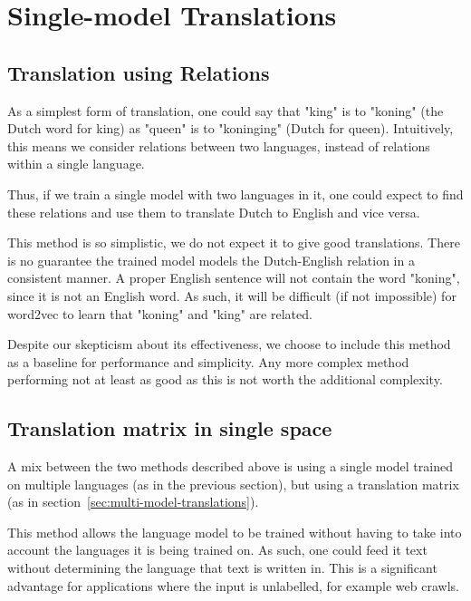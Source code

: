 \section{Single-model Translations}
\label{sec:single-model-translations}

\subsection{Translation using Relations}
\label{sec:single-model-no-matrix}
As a simplest form of translation, one could say that "king" is to "koning" (the Dutch word for king) as "queen" is to "koninging" (Dutch for queen). Intuitively, this means we consider relations between two languages, instead of relations within a single language.

Thus, if we train a single model with two languages in it, one could expect to find these relations and use them to translate Dutch to English and vice versa.

This method is so simplistic, we do not expect it to give good translations. There is no guarantee the trained model models the Dutch-English relation in a consistent manner. A proper English sentence will not contain the word "koning", since it is not an English word. As such, it will be difficult (if not impossible) for word2vec to learn that "koning" and "king" are related.

Despite our skepticism about its effectiveness, we choose to include this method as a baseline for performance and simplicity. Any more complex method performing not at least as good as this is not worth the additional complexity.

\subsection{Translation matrix in single space}
\label{sec:single-model-with-matrix}
A mix between the two methods described above is using a single model trained on multiple languages (as in the previous section), but using a translation matrix (as in section~\ref{sec:multi-model-translations}).

This method allows the language model to be trained without having to take into account the languages it is being trained on. As such, one could feed it text without determining the language that text is written in. This is a significant advantage for applications where the input is unlabelled, for example web crawls.
